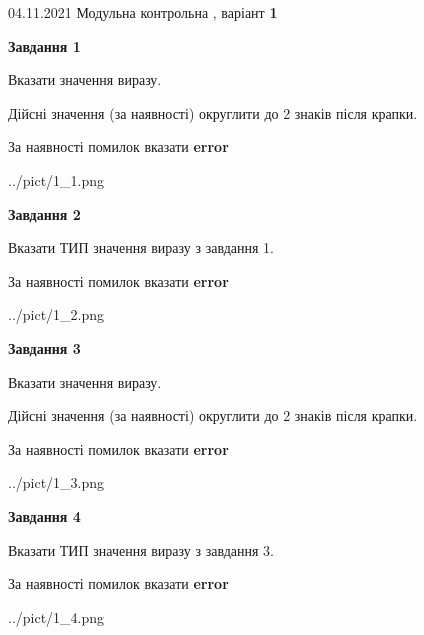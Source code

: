 \documentclass[11pt, ukrainian]{article}
\begin{document}
{04.11.2021 Модульна контрольна , варіант  \No \textbf { 1 }\par}
{
\begin {large}
{\begin {center}\textbf{Завдання 1}\end {center}}\par
Вказати значення виразу. \par
Дійсні значення (за наявності) округлити до 2 знаків після крапки. \par
За наявності помилок вказати \textbf{error}

\begin{center}
	{../pict/1_1.png}
\end{center}
\newpage

{\begin {center}\textbf{Завдання 2}\end {center}}\par
Вказати ТИП значення виразу з завдання 1. \par
За наявності помилок вказати \textbf{error}

\begin{center}
	{../pict/1_2.png}
\end{center}
\newpage

{\begin {center}\textbf{Завдання 3}\end {center}}\par
Вказати значення виразу. \par
Дійсні значення (за наявності) округлити до 2 знаків після крапки. \par
За наявності помилок вказати \textbf{error}

\begin{center}
	{../pict/1_3.png}
\end{center}
\newpage

{\begin {center}\textbf{Завдання 4}\end {center}}\par
Вказати ТИП значення виразу з завдання 3. \par
За наявності помилок вказати \textbf{error}

\begin{center}
	{../pict/1_4.png}
\end{center}
\newpage


\end{large}}
\end{document}
